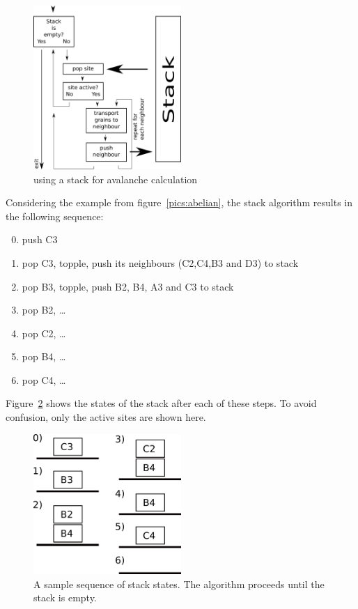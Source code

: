 \begin{figure}[!htpb]
\centering
\includegraphics[width=0.5\textwidth]{pics/pic3_stack2.pdf}
\caption[]{using a stack for avalanche calculation}
\label{pics:stack2}
\end{figure}

Considering the example from figure~\ref{pics:abelian}, the stack algorithm results in the following sequence:
\begin{enumerate}
 \setcounter{enumi}{-1}
 \item push C3
 \item pop C3, topple, push its neighbours (C2,C4,B3 and D3) to stack
 \item pop B3, topple, push B2, B4, A3 and C3 to stack
 \item pop B2, \ldots
 \item pop C2, \ldots
 \item pop B4, \ldots
 \item pop C4, \ldots
\end{enumerate}
Figure~\ref{pics:stack1} shows the states of the stack after each of these steps. To avoid confusion, only the active sites are shown here.

\begin{figure}[!htpb]
\centering
\includegraphics[width=0.5\textwidth]{pics/pic2_stack1.pdf}
\caption[]{A sample sequence of stack states. The algorithm proceeds until the stack is empty.}
\label{pics:stack1}
\end{figure}

